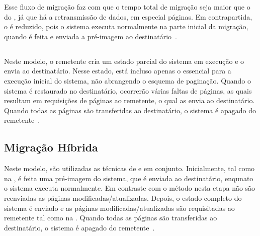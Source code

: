 Esse fluxo de migração faz com que o tempo total de migração seja maior que o do \coldmigration, já que há a retransmissão de dados, em especial páginas. Em contrapartida, o \downtime é reduzido, pois o sistema executa normalmente na parte inicial da migração, quando é feita e enviada a pré-imagem ao destinatário~\cite{singh2022predictive}.

\subsection{\Postcopymigration}
Neste modelo, o remetente cria um estado parcial do sistema em execução e o envia ao destinatário. Nesse estado, está incluso apenas o essencial para a execução inicial do sistema, não abrangendo o esquema de paginação. Quando o sistema é restaurado no destinatário, ocorrerão várias faltas de páginas, as quais resultam em requisições de páginas ao remetente, o qual as envia ao destinatário. Quando todas as páginas são transferidas ao destinatário, o sistema é apagado do remetente~\cite{singh2022predictive}.

\subsection{Migração Híbrida}
Neste modelo, são utilizadas as técnicas de \precopy e \postcopy em conjunto. Inicialmente, tal como na \precopymigration, é feita uma pré-imagem do sistema, que é enviada ao destinatário, enqunato o sistema executa normalmente. Em contraste com o método \precopy nesta etapa não são reenviadas as páginas modificadas/atualizadas. Depois, o estado completo do sistema é enviado e as páginas modificadas/atualizadas são requisitadas ao remetente tal como na \postcopymigration. Quando todas as páginas são transferidas ao destinatário, o sistema é apagado do remetente~\cite{singh2022predictive}.